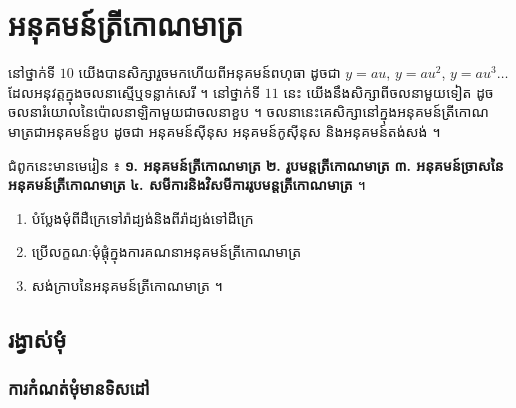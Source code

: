 \chapter{អនុគមន៍ត្រីកោណមាត្រ}

នៅថ្នាក់ទី $10$ យើងបានសិក្សារួចមកហើយពីអនុគមន៍ពហុធា ដូចជា $y = au$, $y = au^2$, $y = au^3 \ldots$ ដែលអនុវត្តក្នុងចលនាស្មើឬទន្លាក់សេរី ។ នៅថ្នាក់ទី $11$ នេះ យើងនឹងសិក្សាពីចលនាមួយទៀត ដូចចលនារំយោលនៃប៉ោលនាឡិកាមួយជាចលនាខួប ។ ចលនានេះគេសិក្សានៅក្នុងអនុគមន៍ត្រីកោណមាត្រជាអនុគមន៍ខួប ដូចជា អនុគមន៍ស៊ីនុស អនុគមន៍កូស៊ីនុស និងអនុគមន៍តង់សង់ ។

\begin{note}[ជំពូកទី ៣ ៖ អនុគមន៍ត្រីកោណមាត្រ]
ជំពូកនេះមានមេរៀន ៖ \textbf{១. អនុគមន៍ត្រីកោណមាត្រ} \quad \textbf{២. រូបមន្តត្រីកោណមាត្រ} \quad \textbf{៣. អនុគមន៍ច្រាសនៃអនុគមន៍ត្រីកោណមាត្រ} \quad \textbf{៤. សមីការនិងវិសមីការរូបមន្តត្រីកោណមាត្រ} ។
\end{note}

\begin{objBox}[វត្ថុបំណង]
\begin{enumerate}[1]
  \item បំប្លែងមុំពីដឺក្រេទៅរ៉ាដ្យង់និងពីរ៉ាដ្យង់ទៅដឺក្រេ
  \item ប្រើលក្ខណៈមុំផ្តុំក្នុងការគណនាអនុគមន៍ត្រីកោណមាត្រ
  \item សង់ក្រាបនៃអនុគមន៍ត្រីកោណមាត្រ ។
\end{enumerate}
\end{objBox}

\section{រង្វាស់មុំ}

\subsection{ការកំណត់មុំមានទិសដៅ}

